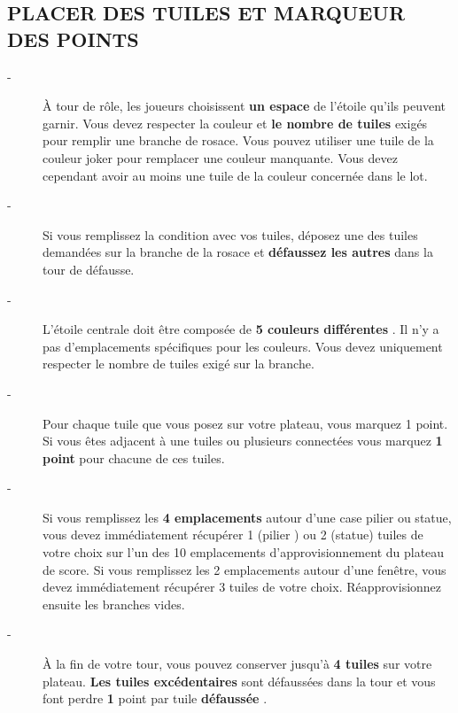 \documentclass{scrartcl}%
\begin{document}
%
\subsection{ PLACER DES TUILES ET MARQUEUR DES POINTS
}%
\label{subsec:PLACERDESTUILESETMARQUEURDESPOINTS}%
\begin{description}%
\item[{-} ]%
%
 À tour de rôle, les joueurs choisissent %
\textcolor{mygreen}{%
\textbf{un espace}%
}%
\textit{ }%
 de l'étoile qu'ils peuvent garnir. Vous devez respecter la couleur et %
\textcolor{mygreen}{%
\textbf{le nombre de tuiles}%
}%
\textit{ }%
 exigés pour remplir une branche de rosace. Vous pouvez utiliser une tuile de la couleur joker pour remplacer une couleur manquante. Vous devez cependant avoir au moins une tuile de la couleur concernée dans le lot.
%
\item[{-} ]%
%
 Si vous remplissez la condition avec vos tuiles, déposez une des tuiles demandées sur la branche de la rosace et %
\textcolor{mygreen}{%
\textbf{défaussez les autres}%
}%
\textit{ }%
 dans la tour de défausse.
%
\item[{-} ]%
%
 L'étoile centrale doit être composée de %
\textcolor{mygreen}{%
\textbf{5 couleurs différentes}%
}%
. Il n'y a pas d'emplacements spécifiques pour les couleurs. Vous devez uniquement respecter le nombre de tuiles exigé sur la branche.
%
\item[{-} ]%
%
 Pour chaque tuile que vous posez sur votre plateau, vous marquez 1 point. Si vous êtes adjacent à une tuiles ou plusieurs connectées vous marquez %
\textcolor{mygreen}{%
\textbf{1 point}%
}%
\textit{ }%
 pour chacune de ces tuiles.
%
\item[{-} ]%
%
 Si vous remplissez les %
\textcolor{mygreen}{%
\textbf{4 emplacements}%
}%
\textit{ }%
 autour d'une case pilier ou statue, vous devez immédiatement récupérer 1 (pilier ) ou 2 (statue) tuiles de votre choix sur l'un des 10 emplacements d'approvisionnement du plateau de score. Si vous remplissez les 2 emplacements autour d'une fenêtre, vous devez immédiatement récupérer 3 tuiles de votre choix. Réapprovisionnez ensuite les branches vides.
%
\item[{-} ]%
%
 À la fin de votre tour, vous pouvez conserver jusqu'à %
\textcolor{mygreen}{%
\textbf{4 tuiles}%
}%
\textit{ }%
 sur votre plateau.%
\textcolor{mygreen}{%
\textbf{ Les tuiles excédentaires}%
}%
\textit{ }%
 sont défaussées dans la tour et vous font perdre %
\textcolor{mygreen}{%
\textbf{1}%
}%
\textit{ }%
 point par tuile %
\textcolor{mygreen}{%
\textbf{défaussée}%
}%
.
%
\end{description}
\end{document}
